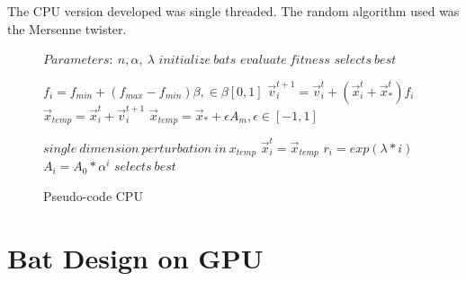 \documentclass[conference]{IEEEtran}
\begin{document}
The CPU version developed was single threaded.
The random algorithm used was the Mersenne twister.

\begin{figure}
\begin{algorithmic}[1]
\State $Parameters:\ n,\alpha,\ \lambda$
\State $initialize\ bats$
\State $evaluate\ fitness$
\State $selects\ best$

        \State $f_i=f_{min} + (f_{max} - f_{min})\beta, \in \beta [0,1]$
        \State $\vec{v}_i^{t+1} = \vec{v}_i^{t} + (\vec{x}_i^{t} + \vec{x}_*^{t})f_i$
        \State $\vec{x}_{temp} = \vec{x}_i^{t} + \vec{v}_i^{t+1}$
            \State $\vec{x}_{temp} = \vec{x}_* + \epsilon A_m, \epsilon \in [-1, 1]$
        \EndIf

        \State $single\ dimension\ perturbation\ in\ x_{temp}$
            \State $\vec{x}_i^t = \vec{x}_{temp}$
            \State $r_i = exp(\lambda * i)$
            \State $A_i =  A_{0} * \alpha^i$
        \EndIf
        \State $selects\ best$
    \EndFor
\EndWhile
\end{algorithmic}
\caption{Pseudo-code CPU}\label{GPU}
\end{figure}


\section{Bat Design on GPU}
\end{document}
